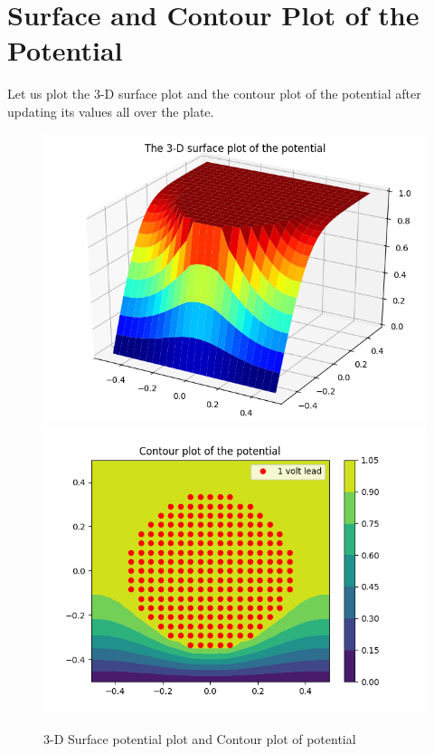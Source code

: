 \documentclass{article}
\begin{document}
\section{Surface and Contour Plot of the Potential}
Let us plot the 3-D surface plot and the contour plot of the potential after updating its values all
over the plate.\newline

\begin{figure}[!tbh]
 \centering
 \includegraphics[scale=0.8]{surface.png}  
 \includegraphics[scale=0.8]{contour2.png}  
 \caption{3-D Surface potential plot and Contour plot of potential}
\end{figure}
\end{document}
